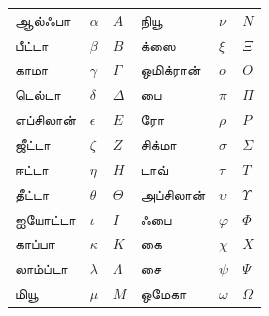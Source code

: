 \documentclass[../../../include/open-logic-chapter]{subfiles}
\begin{document}

\begin{center}
    \begin{tabular}{lll@{\qquad}lll}
    ஆல்ஃபா &	$\alpha$ & $A$ &
    நியூ & $\nu$ & $N$ \\
    பீட்டா & $\beta$ & $B$ &
    க்ஸை & $\xi$ & $\Xi$ \\
    காமா &	$\gamma$ & $\Gamma$ &
    ஒமிக்ரான் & $o$ & $O$ \\
    டெல்டா & $\delta$ & $\Delta$ &
    பை & $\pi$ & $\Pi$ \\
    எப்சிலான் & $\epsilon$ & $E$ &
    ரோ & $\rho$ & $P$ \\
    ஜீட்டா & $\zeta$ & $Z$ &
    சிக்மா &	$\sigma$ & $\Sigma$ \\
    ஈட்டா & $\eta$ & $H$ &
    டாவ் & $\tau$ & $T$ \\
    தீட்டா & $\theta$ & $\Theta$ &
    அப்சிலான் & $\upsilon$ & $\Upsilon$ \\
    ஐயோட்டா & $\iota$ & $I$ &
    ஃபை & $\varphi$ & $\Phi$ \\
    காப்பா & $\kappa$ & $K$ &
    கை & $\chi$ & $X$ \\
    லாம்ப்டா & $\lambda$ & $\Lambda$ &
    சை & $\psi$ & $\Psi$ \\
    மியூ & $\mu$ & $M$ &
    ஒமேகா & $\omega$ & $\Omega$
    \end{tabular}
\end{center}
\end{document}
